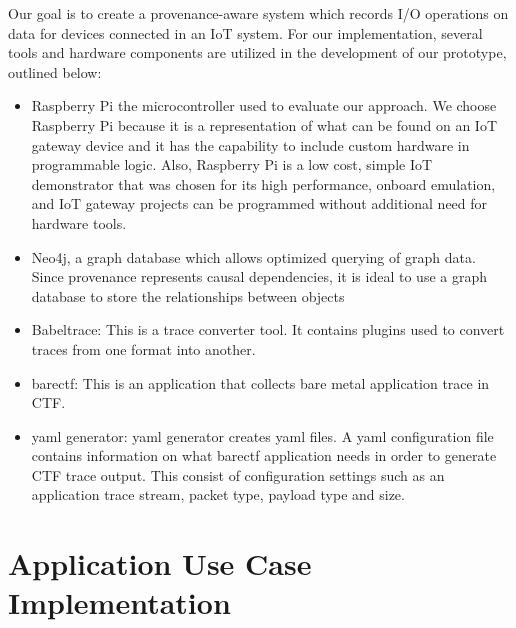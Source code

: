 Our goal is to create a provenance-aware system which records I/O operations on data for devices connected in an IoT system. For our implementation, several tools and hardware components are utilized in the development of our prototype, outlined below:

\begin{itemize}
\item Raspberry Pi the microcontroller used to evaluate our approach. We choose Raspberry Pi because it is a representation of what can be found on an IoT gateway device and it has the capability to include custom hardware in programmable logic. Also, Raspberry Pi is a low cost, simple IoT demonstrator that was chosen for its high performance, on­board emulation, and IoT gateway projects can be programmed without additional need for hardware tools.


\item Neo4j, a graph database which allows optimized querying of graph data. Since provenance represents causal dependencies, it is ideal to use a graph database to store the relationships between objects


\item Babeltrace:  This is a trace converter tool. It contains plugins used to convert traces from one format into another. 

\item barectf: This is an application that collects bare metal application trace in CTF.

\item yaml generator: yaml generator creates yaml files. A yaml configuration file contains information on what barectf application needs in order to generate CTF trace output. This consist of configuration settings such as an application trace stream, packet type, payload type and size. 


\end{itemize}


\section{Application Use Case Implementation} \label{use_case_application}

